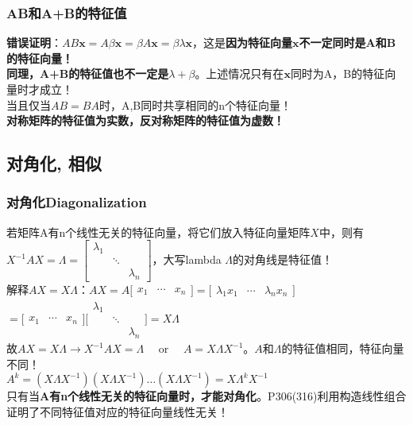    \subsubsection{AB和A+B的特征值}
    \textbf{错误证明}：$A B \boldsymbol{x}=A \beta \boldsymbol{x}=\beta A \boldsymbol{x}=\beta \lambda \boldsymbol{x}$，这是\textbf{因为特征向量$\bm{x}$不一定同时是A和B的特征向量！}
    \\
    \textbf{同理，A+B的特征值也不一定是$\lambda + \beta$}。上述情况只有在$\bm{x}$同时为A，B的特征向量时才成立！
    \\
    当且仅当$A B=B A$时，A,B同时共享相同的n个特征向量！\\
    \textbf{对称矩阵的特征值为实数，反对称矩阵的特征值为虚数！}
    \subsection{对角化, 相似}
    \subsubsection{对角化Diagonalization}
    若矩阵A有n个线性无关的特征向量，将它们放入特征向量矩阵$X$中，则有$X^{-1} A X=\Lambda=\left[\begin{array}{ccc}{\lambda_{1}} & {} & {} \\ {} & {\ddots} & {} \\ {} & {} & {\lambda_{n}}\end{array}\right]$，大写lambda $\Lambda$的对角线是特征值！
    \\
    解释$A X=X \Lambda$：$A X=A\Bigg[\begin{array}{lll}{x_{1}} & {\cdots} & {x_{n}}\end{array}\Bigg]=\Bigg[\begin{array}{lll}{\lambda_{1} x_{1}} & {\cdots} & {\lambda_{n} x_{n}}\end{array}\Bigg]$
    $=\Bigg[\begin{array}{ccc}{x_{1}} & {\cdots} & {x_{n}}\end{array}\Bigg]\Bigg[\begin{array}{ccc}{\lambda_{1}} & {} \\ {} & {\ddots} & {} \\ {} & {} & {\lambda_{n}}\end{array}\Bigg]=X \Lambda$
    \\
    故$A X=X \Lambda \rightarrow X^{-1} A X=\Lambda \quad$ or $\quad A=X \Lambda X^{-1}$。$A$和$\Lambda$的特征值相同，特征向量不同！
    \\
    $A^{k}=\left(X \Lambda X^{-1}\right)\left(X \Lambda X^{-1}\right) \ldots\left(X \Lambda X^{-1}\right)=X \Lambda^{k} X^{-1}$
    \\
    只有当\textbf{A有n个线性无关的特征向量时，才能对角化}。P306(316)利用构造线性组合证明了不同特征值对应的特征向量线性无关！

